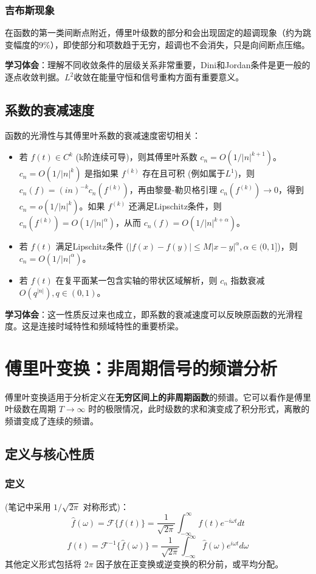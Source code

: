 \documentclass[UTF8]{ctexart}
\begin{document}
	\subsubsection{吉布斯现象}
	在函数的第一类间断点附近，傅里叶级数的部分和会出现固定的超调现象（约为跳变幅度的9\%），即使部分和项数趋于无穷，超调也不会消失，只是向间断点压缩。
	
	\textbf{学习体会}：理解不同收敛条件的层级关系非常重要，Dini和Jordan条件是更一般的逐点收敛判据。$L^2$收敛在能量守恒和信号重构方面有重要意义。
	
	\subsection{系数的衰减速度}
	函数的光滑性与其傅里叶系数的衰减速度密切相关：
	\begin{itemize}
		\item 若 $f(t) \in C^k$ (k阶连续可导)，则其傅里叶系数 $c_n = O(1/|n|^{k+1})$。 $c_n = O(1/|n|^k)$ 是指如果 $f^{(k)}$ 存在且可积 (例如属于$L^1$)，则 $c_n(f) = (in)^{-k} c_n(f^{(k)})$，再由黎曼-勒贝格引理 $c_n(f^{(k)}) \to 0$，得到 $c_n = o(1/|n|^k)$。如果 $f^{(k)}$ 还满足Lipschitz条件，则 $c_n(f^{(k)}) = O(1/|n|^\alpha)$，从而 $c_n(f) = O(1/|n|^{k+\alpha})$。
		\item 若 $f(t)$ 满足Lipschitz条件 ($|f(x)-f(y)| \le M|x-y|^\alpha, \alpha \in (0,1]$)，则 $c_n = O(1/|n|^\alpha)$。
		\item 若 $f(t)$ 在复平面某一包含实轴的带状区域解析，则 $c_n$ 指数衰减 $O(q^{|n|}), q \in (0,1)$。
	\end{itemize}
	\textbf{学习体会}：这一性质反过来也成立，即系数的衰减速度可以反映原函数的光滑程度。这是连接时域特性和频域特性的重要桥梁。
	
	\section{傅里叶变换：非周期信号的频谱分析}
	傅里叶变换适用于分析定义在\textbf{无穷区间上的非周期函数}的频谱。它可以看作是傅里叶级数在周期 $T \to \infty$ 时的极限情况，此时级数的求和演变成了积分形式，离散的频谱变成了连续的频谱。
	
	\subsection{定义与核心性质}
	\subsubsection{定义}
	(笔记中采用 $1/\sqrt{2\pi}$ 对称形式)：
	\[ \hat{f}(\omega) = \mathcal{F}\{f(t)\} = \frac{1}{\sqrt{2\pi}} \int_{-\infty}^{\infty} f(t) e^{-i\omega t} dt \]
	\[ f(t) = \mathcal{F}^{-1}\{\hat{f}(\omega)\} = \frac{1}{\sqrt{2\pi}} \int_{-\infty}^{\infty} \hat{f}(\omega) e^{i\omega t} d\omega \]
	其他定义形式包括将 $2\pi$ 因子放在正变换或逆变换的积分前，或平均分配。
	
\end{document}
